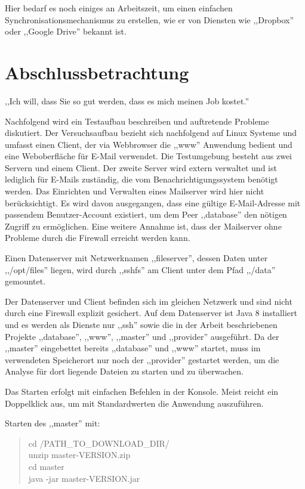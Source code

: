 \documentclass[oneside, ngerman, toc=bibliography,bibliography=totoc,listof=entryprefix, open=right,numbers=noenddot,fontsize=12pt]{scrbook}
\newcommand\chapmd[2]{\begin{mdframed}[%
		rightline=false,leftline=false,topline=false,bottomline=false,frametitlerule=false,
		userdefinedwidth=\textwidth,frametitlealignment=\flushright, %
		frametitlerulecolor=black,frametitle={\small #1}]
		\flushright{} \footnotesize{} #2
	\end{mdframed}}
\begin{document}
\bigskip

Hier bedarf es noch einiges an Arbeitszeit, um einen einfachen Synchronisationsmechanismus zu erstellen, wie er von Diensten wie ,,Dropbox'' oder ,,Google Drive'' bekannt ist.

 
\chapter{Abschlussbetrachtung}
 
\chapmd{Projektmanagementkurs Universität Duisburg-Essen}{,,Ich will, dass Sie so gut werden, dass es mich meinen Job kostet.''}


Nachfolgend wird ein Testaufbau beschreiben und auftretende Probleme diskutiert. Der Versuchsaufbau bezieht sich nachfolgend auf Linux Systeme und umfasst einen Client, der via Webbrowser die ,,www'' Anwendung bedient und eine Weboberfläche für E-Mail verwendet.
Die Testumgebung besteht aus zwei Servern und einem Client. Der zweite Server wird extern verwaltet und ist lediglich für E-Mails zuständig, die vom Benachrichtigungssystem benötigt werden. Das Einrichten und Verwalten eines Mailserver wird hier nicht berücksichtigt. Es wird davon ausgegangen, dass eine gültige E-Mail-Adresse mit passendem Benutzer-Account existiert, um dem Peer ,,database'' den nötigen Zugriff zu ermöglichen. Eine weitere Annahme ist, dass der Mailserver ohne Probleme durch die Firewall erreicht werden kann.

Einen Datenserver mit Netzwerknamen ,,fileserver'', dessen Daten unter ,,/opt/files'' liegen, wird durch ,,sshfs'' am Client unter dem Pfad ,,/data'' gemountet.

Der Datenserver und Client befinden sich im gleichen Netzwerk und sind nicht durch eine Firewall explizit gesichert. Auf dem Datenserver ist Java 8 installiert und es werden als Dienste nur ,,ssh'' sowie die in der Arbeit beschriebenen Projekte ,,database'', ,,www'', ,,master'' und ,,provider'' ausgeführt. Da der ,,master'' eingebettet bereits ,,database'' und ,,www'' startet, muss im verwendeten Speicherort nur noch der ,,provider'' gestartet werden, um die Analyse für  dort liegende Dateien zu starten und zu überwachen.

Das Starten erfolgt mit einfachen Befehlen in der Konsole. Meist reicht ein Doppelklick aus, um mit Standardwerten die Anwendung auszuführen. 

\bigskip

Starten des ,,master'' mit: 
\begin{quote}
    cd /PATH\_TO\_DOWNLOAD\_DIR/ \\
    unzip master-VERSION.zip \\
    cd master \\
    java -jar master-VERSION.jar 
\end{quote}
\end{document}
